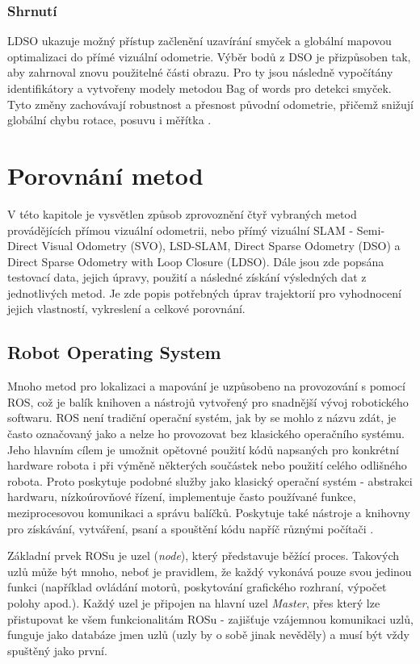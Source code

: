\documentclass[12pt,a4paper]{article}
\begin{document}
\subsubsection*{Shrnutí}
LDSO ukazuje možný přístup začlenění uzavírání smyček a globální mapovou optimalizaci do přímé vizuální odometrie. Výběr bodů z DSO je přizpůsoben tak, aby zahrnoval znovu použitelné části obrazu. Pro ty jsou následně vypočítány identifikátory a vytvořeny modely metodou Bag of words pro detekci smyček. Tyto změny zachovávají robustnost a přesnost původní odometrie, přičemž snižují globální chybu rotace, posuvu i měřítka \cite{LDSO}.


\section{Porovnání metod}
V této kapitole je vysvětlen způsob zprovoznění čtyř vybraných metod provádějících přímou vizuální odometrii, nebo přímý vizuální SLAM - Semi-Direct Visual Odometry (SVO), LSD-SLAM, Direct Sparse Odometry (DSO) a Direct Sparse Odometry with Loop Closure (LDSO). Dále jsou zde popsána testovací data, jejich úpravy, použití a následné získání výsledných dat z jednotlivých metod. Je zde popis potřebných úprav trajektorií pro vyhodnocení jejich vlastností, vykreslení a celkové porovnání.

\subsection{Robot Operating System}
Mnoho metod pro lokalizaci a mapování je uzpůsobeno na provozování s pomocí ROS, což je balík knihoven a nástrojů vytvořený pro snadnější vývoj robotického softwaru. ROS není tradiční operační systém, jak by se mohlo z názvu zdát, je často označovaný jako  a nelze ho provozovat bez klasického operačního systému. Jeho hlavním cílem je umožnit opětovné použití kódů napsaných pro konkrétní hardware robota i při výměně některých součástek nebo použití celého odlišného robota. Proto poskytuje podobné služby jako klasický operační systém - abstrakci hardwaru, nízkoúrovňové řízení, implementuje často používané funkce, meziprocesovou komunikaci a správu balíčků. Poskytuje také nástroje a knihovny pro získávání, vytváření, psaní a spouštění kódu napříč různými počítači \cite{ROS}.

Základní prvek ROSu je uzel (\textit{node}), který představuje běžící proces. Takových uzlů může být mnoho, neboť je pravidlem, že každý vykonává pouze svou jedinou funkci (například ovládání motorů, poskytování grafického rozhraní, výpočet polohy apod.). Každý uzel je připojen na hlavní uzel \textit{Master}, přes který lze přistupovat ke všem funkcionalitám ROSu - zajišťuje vzájemnou komunikaci uzlů, funguje jako databáze jmen uzlů (uzly by o sobě jinak nevěděly) a musí být vždy spuštěný jako první. 
\end{document}
